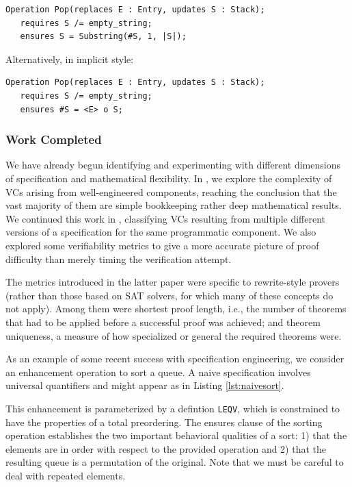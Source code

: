 \begin{lstlisting}
Operation Pop(replaces E : Entry, updates S : Stack);
   requires S /= empty_string;
   ensures S = Substring(#S, 1, |S|);
\end{lstlisting}

Alternatively, in implicit style:

\begin{lstlisting}
Operation Pop(replaces E : Entry, updates S : Stack);
   requires S /= empty_string;
   ensures #S = <E> o S;
\end{lstlisting}

\subsubsection{Work Completed}
We have already begun identifying and experimenting with different dimensions of specification and mathematical flexibility.  In \cite{kirschenbaumDeepMathematics}, we explore the complexity of VCs arising from well-engineered components, reaching the conclusion that the vast majority of them are simple bookkeeping rather deep mathematical results.  We continued this work in \cite{smithSpecificationAbstractions}, classifying VCs resulting from multiple different versions of a specification for the same programmatic component.  We also explored some verifiability metrics to give a more accurate picture of proof difficulty than merely timing the verification attempt.

The metrics introduced in the latter paper were specific to rewrite-style provers (rather than those based on SAT solvers, for which many of these concepts do not apply).  Among them were shortest proof length, i.e., the number of theorems that had to be applied before a successful proof was achieved; and theorem uniqueness, a measure of how specialized or general the required theorems were.

As an example of some recent success with specification engineering, we consider an enhancement operation to sort a queue.  A naive specification involves universal quantifiers and might appear as in Listing \ref{lst:naivesort}.



This enhancement is parameterized by a defintion \texttt{LEQV}, which is constrained to have the properties of a total preordering.  The ensures clause of the sorting operation establishes the two important behavioral qualities of a sort: 1) that the elements are in order with respect to the provided operation and 2) that the resulting queue is a permutation of the original.  Note that we must be careful to deal with repeated elements.

